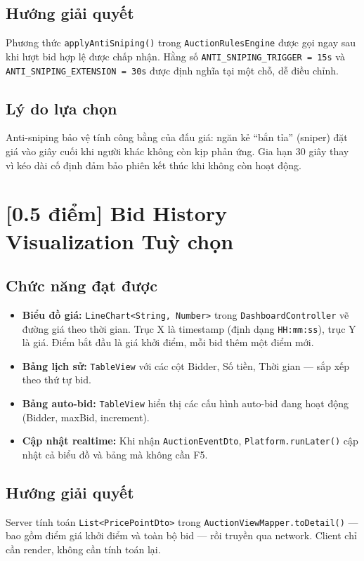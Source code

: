 \documentclass[12pt,a4paper]{article}
\newcommand{\score}[1]{\textbf{[#1 điểm]}}
\newcommand{\optional}{\textcolor{optionalcolor}{\textbf{Tuỳ chọn}}}
\newcommand{\filepath}[1]{\texttt{\small #1}}
\begin{document}
\subsection*{Hướng giải quyết}
Phương thức \texttt{applyAntiSniping()} trong \filepath{AuctionRulesEngine} được gọi ngay sau khi lượt bid hợp lệ được chấp nhận. Hằng số \texttt{ANTI\_SNIPING\_TRIGGER = 15s} và \texttt{ANTI\_SNIPING\_EXTENSION = 30s} được định nghĩa tại một chỗ, dễ điều chỉnh.

\subsection*{Lý do lựa chọn}
Anti-sniping bảo vệ tính công bằng của đấu giá: ngăn kẻ ``bắn tỉa'' (sniper) đặt giá vào giây cuối khi người khác không còn kịp phản ứng. Gia hạn 30 giây thay vì kéo dài cố định đảm bảo phiên kết thúc khi không còn hoạt động.

\section{\score{0.5} Bid History Visualization \hfill \optional}

\subsection*{Chức năng đạt được}

\begin{itemize}[leftmargin=1.5em]
  \item \textbf{Biểu đồ giá:} \texttt{LineChart<String, Number>} trong \texttt{DashboardController} vẽ đường giá theo thời gian. Trục X là timestamp (định dạng \texttt{HH:mm:ss}), trục Y là giá. Điểm bắt đầu là giá khởi điểm, mỗi bid thêm một điểm mới.
  \item \textbf{Bảng lịch sử:} \texttt{TableView} với các cột Bidder, Số tiền, Thời gian — sắp xếp theo thứ tự bid.
  \item \textbf{Bảng auto-bid:} \texttt{TableView} hiển thị các cấu hình auto-bid đang hoạt động (Bidder, maxBid, increment).
  \item \textbf{Cập nhật realtime:} Khi nhận \texttt{AuctionEventDto}, \texttt{Platform.runLater()} cập nhật cả biểu đồ và bảng mà không cần F5.
\end{itemize}

\subsection*{Hướng giải quyết}
Server tính toán \texttt{List<PricePointDto>} trong \filepath{AuctionViewMapper.toDetail()} — bao gồm điểm giá khởi điểm và toàn bộ bid — rồi truyền qua network. Client chỉ cần render, không cần tính toán lại.
\end{document}
